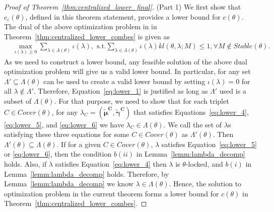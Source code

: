 \documentclass{article}
\begin{document}
\begin{proof}[Proof of Theorem~\ref{thm:centralized_lower_final}]
(Part 1) 
We first show that $c_{\varepsilon}(\theta)$, defined in this theorem statement, provides a lower bound for $c(\theta)$.
The dual of the above optimization problem in in Theorem~\ref{thm:centralized_lower_combes} is given as 
\begin{align}\label{eq:dual}
   &\max_{\iota(\lambda) \geq 0} \sum_{\lambda \in \Lambda(\theta)}\iota(\lambda), \text{ s.t.}  \sum_{\lambda \in \Lambda(\theta)}\iota(\lambda) kl(\theta, \lambda; M) \leq 1, \forall M \notin Stable(\theta).
\end{align}
As we need to construct a lower bound, any feasible solution of the above dual optimization problem will give us a valid lower bound. In particular, for any set $\Lambda' \subseteq \Lambda(\theta)$ can be used to create a valid lower bound by setting $\iota(\lambda) = 0$ for all $\lambda \notin \Lambda'$. Therefore, Equation~\eqref{eq:lower_1} is justified as long as $\Lambda'$ used is a subset of $\Lambda(\theta)$.  For that purpose, we need to show that for each triplet $C \in Cover(\theta)$, for any $\lambda_C = (\boldsymbol{\tilde{\mu}^C}, \boldsymbol{\tilde{\gamma}^C})$ that satisfies Equations~\eqref{eq:lower_4}, \eqref{eq:lower_5}, and \eqref{eq:lower_6} we have $\lambda_C \in \Lambda(\theta)$. We call the set of $\lambda$s satisfying these three equations for some $C \in Cover(\theta)$ as $\Lambda'(\theta)$. Then $\Lambda'(\theta) \subseteq \Lambda(\theta)$.
If for a given $C \in Cover(\theta)$, $\lambda$ satisfies Equation~\eqref{eq:lower_5} or \eqref{eq:lower_6}, then the condition $b(ii)$ in Lemma~\ref{lemm:lambda_decomp} holds. Also, if $\lambda$ satisfies Equation~\eqref{eq:lower_4} then $\lambda$ is $\theta$-locked, and $b(i)$ in Lemma~\ref{lemm:lambda_decomp} holds. Therefore, by Lemma~\ref{lemm:lambda_decomp} we know $\lambda \in \Lambda(\theta)$. Hence, the solution to optimization problem in the current theorem forms a lower bound for $c(\theta)$ in Theorem~\ref{thm:centralized_lower_combes}.


\end{proof}
\end{document}
